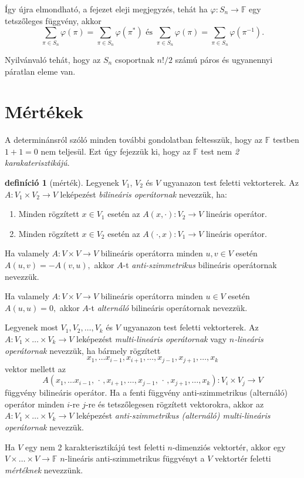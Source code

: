 \documentclass[a4paper, showtrims]{memoir}
\theoremstyle{plain}
\theoremstyle{remark}
\theoremstyle{definition}
\newtheorem{definition}[proposition]{definíció}
\begin{document}
Így újra elmondható, a fejezet eleji megjegyzés,
tehát ha $\varphi:S_n\to\mathbb{F}$ egy tetszőleges függvény, akkor
\[
	\sum_{\pi\in S_n}\varphi\left( \pi \right)
	=
	\sum_{\pi\in S_n}\varphi\left( \pi^\ast \right)
    \text{ és }
	\sum_{\pi\in S_n}\varphi\left( \pi \right)
	=
    \sum_{\pi\in S_n}\varphi\left( \pi^{-1} \right).
\]

Nyilvánvaló tehát, hogy az $S_n$ csoportnak $n!/2$ számú páros és ugyanennyi páratlan eleme van.
\section{Mértékek}
A determinánsról szóló minden további gondolatban feltesszük,
hogy az $\mathbb{F}$ testben $1+1=0$ nem teljesül.
Ezt úgy fejezzük ki, hogy az $\mathbb{F}$ test nem \emph{2 karakaterisztikájú}.
\begin{definition}[mérték]
	Legyenek $V_{1}$, $V_{2}$ és $V$ ugyanazon test feletti vektorterek.
	Az $A:V_{1}\times V_{2}\rightarrow V$ leképezést \emph{bilineáris operátornak}
	nevezzük, ha:
	\begin{enumerate}
		\item
		      Minden rögzített $x\in V_{1}$ esetén az $A\left( x,\cdot \right):V_{2}\rightarrow V$ lineáris operátor.
		\item
		      Minden rögzített $x\in V_{2}$ esetén az $A\left( \cdot ,x\right):V_{1}\rightarrow V$ lineáris operátor.
	\end{enumerate}

	Ha valamely $A:V\times V\rightarrow V$ bilineáris operátorra minden $u,v\in V$ esetén
	\(
	A\left( u,v\right) =-A\left( v,u\right),
	\)
	akkor $A$-t \emph{anti-szimmetrikus} bilineáris operátornak nevezzük.

	Ha valamely $A:V\times V\rightarrow V$ bilineáris operátorra minden $u\in V$ esetén
	\(
	A\left( u,u\right) = 0,
	\)
	akkor $A$-t \emph{alternáló} bilineáris operátornak nevezzük.

	Legyenek most $V_{1},V_{2},\ldots ,V_{k}$ és $V$ ugyanazon test feletti vektorterek.
	Az $A:V_{1}\times \ldots \times V_{k}\rightarrow V$ leképezést \emph{multi-lineáris operátornak}
	vagy $n$\emph{-lineáris operátornak }nevezzük,
	ha bármely rögzített
	\[
		x_{1},\ldots x_{i-1},x_{i+1},\ldots ,x_{j-1},x_{j+1},\ldots ,x_{k}
	\]
	vektor mellett az
	\[
		A\left( x_{1},\ldots x_{i-1},\,\cdot\, ,x_{i+1},\ldots ,x_{j-1},\,\cdot\, ,x_{j+1},\ldots ,x_{k}\right)
		:
		V_{i}\times V_{j}\rightarrow V
	\]
	függvény bilineáris operátor.
	Ha a fenti függvény anti-szimmetrikus (alternáló) operátor minden $i$-re $j$-re és tetszőlegesen rögzített vektorokra,
	akkor az
	$A:V_{1}\times \ldots \times V_{k}\rightarrow V$
	leképezést \emph{anti-szimmetrikus (alternáló) multi-lineáris operátornak} nevezzük.

	Ha $V$ egy nem 2 karakterisztikájú test feletti $n$-dimenziós vektortér,
    akkor egy $V\times \dots \times V\to \mathbb{F}$ $n$-lineáris anti-szimmetrikus függvényt
	a $V$ vektortér feletti \emph{mértéknek} nevezzünk.
\end{definition}
\end{document}
